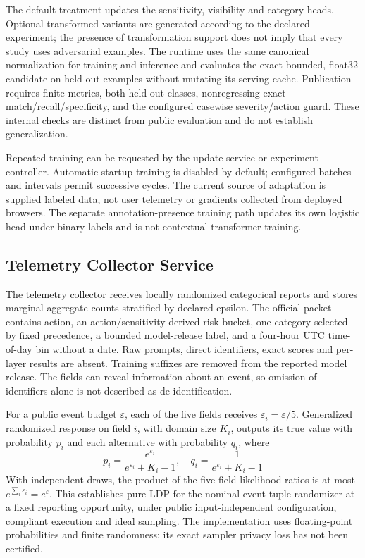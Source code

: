 \documentclass[conference]{IEEEtran}
\begin{document}
The default treatment updates the sensitivity, visibility and category heads. Optional transformed variants are generated according to the declared experiment; the presence of transformation support does not imply that every study uses adversarial examples. The runtime uses the same canonical normalization for training and inference and evaluates the exact bounded, float32 candidate on held-out examples without mutating its serving cache. Publication requires finite metrics, both held-out classes, nonregressing exact match/recall/specificity, and the configured casewise severity/action guard. These internal checks are distinct from public evaluation and do not establish generalization.

Repeated training can be requested by the update service or experiment controller. Automatic startup training is disabled by default; configured batches and intervals permit successive cycles. The current source of adaptation is supplied labeled data, not user telemetry or gradients collected from deployed browsers. The separate annotation-presence training path updates its own logistic head under binary labels and is not contextual transformer training.

\subsection{Telemetry Collector Service}
\label{sec:telemetry_mechanism}

The telemetry collector receives locally randomized categorical reports and stores marginal aggregate counts stratified by declared epsilon. The official packet contains action, an action/sensitivity-derived risk bucket, one category selected by fixed precedence, a bounded model-release label, and a four-hour UTC time-of-day bin without a date. Raw prompts, direct identifiers, exact scores and per-layer results are absent. Training suffixes are removed from the reported model release. The fields can reveal information about an event, so omission of identifiers alone is not described as de-identification.

For a public event budget $\varepsilon$, each of the five fields receives $\varepsilon_i=\varepsilon/5$. Generalized randomized response on field $i$, with domain size $K_i$, outputs its true value with probability $p_i$ and each alternative with probability $q_i$, where
\begin{equation}
p_i=\frac{e^{\varepsilon_i}}{e^{\varepsilon_i}+K_i-1},
\quad q_i=\frac{1}{e^{\varepsilon_i}+K_i-1}
\end{equation}
With independent draws, the product of the five field likelihood ratios is at most $e^{\sum_i\varepsilon_i}=e^\varepsilon$. This establishes pure LDP for the nominal event-tuple randomizer at a fixed reporting opportunity, under public input-independent configuration, compliant execution and ideal sampling. The implementation uses floating-point probabilities and finite randomness; its exact sampler privacy loss has not been certified.
\end{document}
